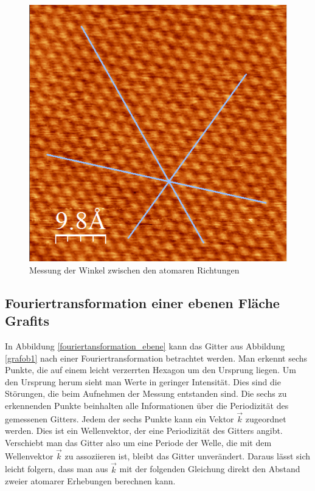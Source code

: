 \documentclass[10pt,a4paper]{article}
\begin{document}
\begin{figure}[h]
	\centering
	
	\includegraphics[scale = 0.7]{Winkelmessung_kristall.png}
	
	\caption{Messung der Winkel zwischen den atomaren Richtungen}
	\label{Messungerh6}
\end{figure}

\subsection{Fouriertransformation einer ebenen Fläche Grafits}

In Abbildung \ref{fouriertansformation_ebene} kann das Gitter aus Abbildung \ref{grafob1} nach einer Fouriertransformation betrachtet werden. Man erkennt sechs Punkte, die auf einem leicht verzerrten Hexagon um den Ursprung liegen. Um den Ursprung herum sieht man Werte in geringer Intensität. Dies sind die Störungen, die beim Aufnehmen der Messung entstanden sind. Die sechs zu erkennenden Punkte beinhalten alle Informationen über die Periodizität des gemessenen Gitters. Jedem der sechs Punkte kann ein Vektor $\vec{k}$ zugeordnet werden. Dies ist ein Wellenvektor, der eine Periodizität des Gitters angibt. Verschiebt man das Gitter also um eine Periode der Welle, die mit dem Wellenvektor $\vec{k}$ zu assoziieren ist, bleibt das Gitter unverändert. Daraus lässt sich leicht folgern, dass man aus $\vec{k}$ mit der folgenden Gleichung direkt den Abstand zweier atomarer Erhebungen berechnen kann.
\end{document}
